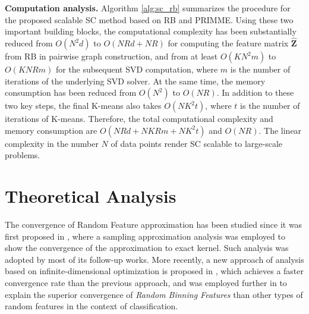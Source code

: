 \documentclass[sigconf]{acmart}
\newcommand{\1}{\boldsymbol{1}}
\newcommand{\bZ}{\mathbf{Z}}
\newcommand{\0}{\boldsymbol{0}}
\begin{document}
\textbf{Computation analysis.} Algorithm \ref{alg:sc_rb} summarizes the procedure for the proposed scalable SC method based on RB and PRIMME. Using these two important building blocks, the computational complexity has been substantially reduced from $O(N^2d)$ to $O(NRd + NR)$ for computing the feature matrix $\widehat{\bZ}$ from RB in pairwise graph construction, and from at least $O(KN^2m)$ to $O(KNRm)$ for the subsequent SVD computation, where $m$ is the number of iterations of the underlying SVD solver. At the same time, the memory consumption has been reduced from $O(N^2)$ to $O(NR)$. In addition to these two key steps, the final K-means also takes $O(NK^2t)$, where $t$ is the number of iterations of K-means. Therefore, the total computational complexity and memory consumption are $O(NRd + NKRm + NK^2t)$ and $O(NR)$. The linear complexity in the number $N$ of data points render SC scalable to large-scale problems.


\section{Theoretical Analysis}
The convergence of Random Feature approximation has been studied since it was first proposed in \cite{rahimi2008random}, where a sampling approximation analysis was employed to show the convergence of the approximation to exact kernel. Such analysis was adopted by most of its follow-up works. More recently, a new approach of analysis based on infinite-dimensional optimization is proposed in \cite{yen2014sparse}, which achieves a faster convergence rate than the previous approach, and was employed further in \cite{wu2016revisiting} to explain the superior convergence of \emph{Random Binning Features} than other types of random features in the context of classification.
\end{document}
